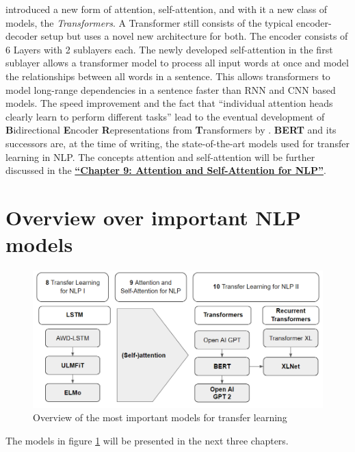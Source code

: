 \documentclass[]{krantz}
\begin{document}
\citet{vaswani2017attention} introduced a new form of attention, self-attention, and with it a new class of models, the \textit{Transformers}. A Transformer still consists of the typical encoder-decoder setup but uses a novel new architecture for both. The encoder consists of 6 Layers with 2 sublayers each. The newly developed self-attention in the first sublayer allows a transformer model to process all input words at once and model the relationships between all words in a sentence. This allows transformers to model long-range dependencies in a sentence faster than RNN and CNN based models. The speed improvement and the fact that ``individual attention heads clearly learn to perform different tasks'' \citet{vaswani2017attention} lead to the eventual development of \textbf{B}idirectional \textbf{E}ncoder \textbf{R}epresentations from \textbf{T}ransformers by \citet{bert}. \textbf{BERT} and its successors are, at the time of writing, the state-of-the-art models used for transfer learning in NLP. The concepts attention and self-attention will be further discussed in the \protect\hyperlink{Attention-and-self-Attention-for-nlp}{\textbf{``Chapter 9: Attention and Self-Attention for NLP''}}.

\hypertarget{overview-over-important-nlp-models}{%
\section{Overview over important NLP models}\label{overview-over-important-nlp-models}}

\begin{figure}

{\centering \includegraphics[width=0.7\linewidth]{figures/02-00-transfer-learning-for-nlp/overview-tranferlearning} 

}

\caption{Overview of the most important models for transfer learning}\label{fig:ch02-figure02}
\end{figure}



The models in figure \ref{fig:ch02-figure02} will be presented in the next three chapters.
\end{document}
